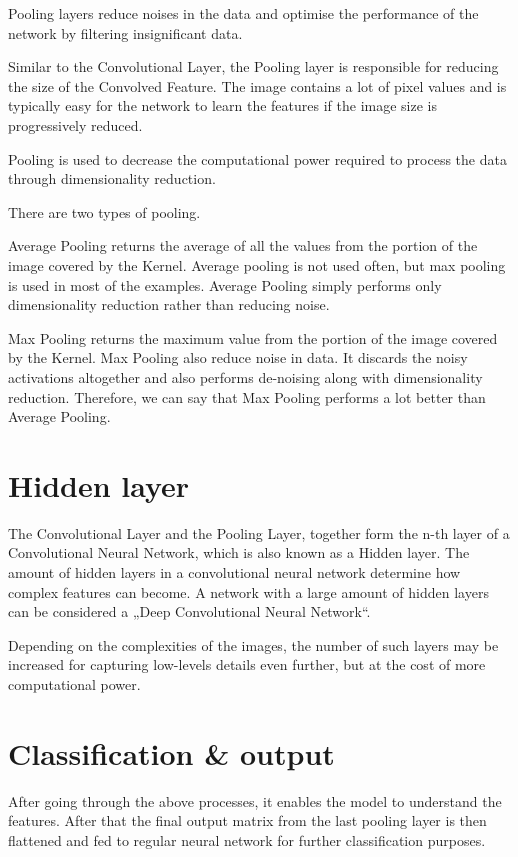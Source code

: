 \documentclass[a4paper,13pt,twoside]{book}
\begin{document}
Pooling layers reduce noises in the data and optimise the performance of the network by filtering insignificant data.

Similar to the Convolutional Layer, the Pooling layer is responsible for reducing the size of the Convolved Feature.
The image contains a lot of pixel values and is typically easy for the network to learn the features if the image size is progressively reduced.

Pooling is used to decrease the computational power required to process the data through dimensionality reduction.

There are two types of pooling.

Average Pooling returns the average of all the values from the portion of the image covered by the Kernel.
Average pooling is not used often, but max pooling is used in most of the examples.
Average Pooling simply performs only dimensionality reduction rather than reducing noise.

Max Pooling returns the maximum value from the portion of the image covered by the Kernel.
Max Pooling also reduce noise in data. It discards the noisy activations altogether and also performs de-noising along with dimensionality reduction.
Therefore, we can say that Max Pooling performs a lot better than Average Pooling.

\section{Hidden layer}
The Convolutional Layer and the Pooling Layer, together form the n-th layer of a Convolutional Neural Network, which is also known as a Hidden layer.
The amount of hidden layers in a convolutional neural network determine how complex features can become. A network with a large amount of hidden layers can be considered a „Deep Convolutional Neural Network“.

Depending on the complexities of the images, the number of such layers may be increased for capturing low-levels details even further, but at the cost of more computational power.

\section{Classification & output}

After going through the above processes, it enables the model to understand the features. After that the final output matrix from the last pooling layer is then flattened and fed to regular neural network for further classification purposes.
\end{document}
